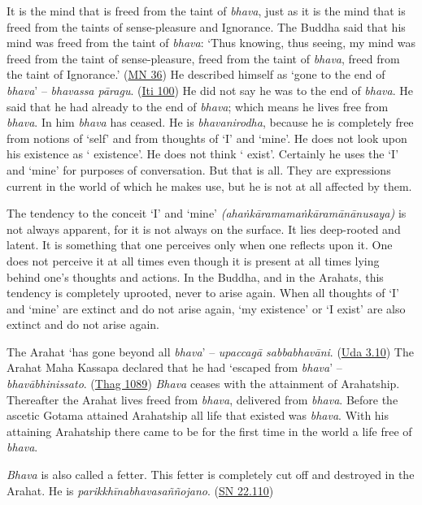 It is the mind that is freed from the taint of \emph{bhava}, just as it is the mind that is freed from the taints of sense-pleasure and Ignorance. The Buddha said that his mind was freed from the taint of \emph{bhava}: `Thus knowing, thus seeing, my mind was freed from the taint of sense-pleasure, freed from the taint of \emph{bhava}, freed from the taint of Ignorance.' (\href{https://suttacentral.net/mn36/en/bodhi}{MN 36}) He described himself as `gone to the end of \emph{bhava}' -- \emph{bhavassa pāragu}. (\href{https://suttacentral.net/iti100/en/sujato}{Iti 100}) He did not say he was  to the end of \emph{bhava}. He said that he had already  to the end of \emph{bhava}; which means he lives free from \emph{bhava}. In him \emph{bhava} has ceased. He is \emph{bhavanirodha}, because he is completely free from notions of `self' and from thoughts of `I' and `mine'. He does not look upon his existence as ` existence'. He does not think ` exist'. Certainly he uses the  `I' and `mine' for purposes of conversation. But that is all. They are expressions current in the world of which he makes use, but he is not at all affected by them.

The tendency to the conceit `I' and `mine' \emph{(ahaṅkāramamaṅkāramānānusaya)} is not always apparent, for it is not always on the surface. It lies deep-rooted and latent. It is something that one perceives only when one reflects upon it. One does not perceive it at all times even though it is present at all times lying behind one's thoughts and actions. In the Buddha, and in the Arahats, this tendency is completely uprooted, never to arise again. When all thoughts of `I' and `mine' are extinct and do not arise again, `my existence' or `I exist' are also extinct and do not arise again.

The Arahat `has gone beyond all \emph{bhava}' -- \emph{upaccagā sabbabhavāni}. (\href{https://suttacentral.net/ud3.10/en/sujato}{Uda 3.10}) The Arahat Maha Kassapa declared that he had `escaped from \emph{bhava}' -- \emph{bhavābhinissato}. (\href{https://suttacentral.net/thag18.1/en/sujato}{Thag 1089}) \emph{Bhava} ceases with the attainment of Arahatship. Thereafter the Arahat lives freed from \emph{bhava}, delivered from \emph{bhava}. Before the ascetic Gotama attained Arahatship all life that existed was \emph{bhava}. With his attaining Arahatship there came to be for the first time in the world a life free of \emph{bhava}.

\emph{Bhava} is also called a fetter. This fetter is completely cut off and destroyed in the Arahat. He is \emph{parikkhīnabhavasaññojano}. (\href{https://suttacentral.net/sn22.110/en/sujato}{SN 22.110})

